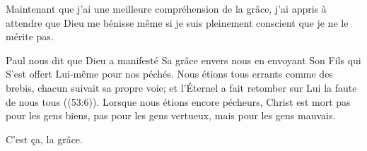 
Maintenant que j'ai une meilleure compréhension de la grâce,
 j'ai appris à attendre que Dieu me bénisse même si je suis pleinement
 conscient que je ne le mérite pas.

Paul nous dit que Dieu a manifesté Sa grâce envers nous en envoyant Son Fils
 qui S'est offert Lui-même pour nos péchés.
 \og Nous étions tous errants comme des brebis, chacun suivait sa propre voie;
 et l'Éternel a fait retomber sur Lui la faute de nous tous \fg{}
 ((53:6)).
 Lorsque nous étions encore pécheurs, Christ est mort
 \ocadr pas pour les gens biens, pas pour les gens vertueux,
 mais pour les gens mauvais.

C'est ça,  la grâce.

\dvrule


